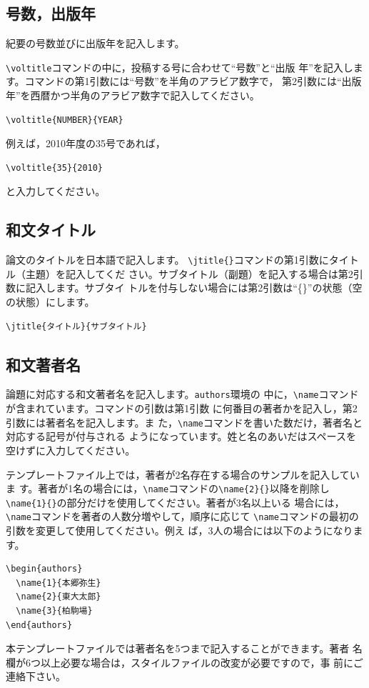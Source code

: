 \documentclass[b5paper,10pt,twocolumn,tombow]{jarticle}
\begin{document}
\subsection{号数，出版年}
紀要の号数並びに出版年を記入します。

\verb|\voltitle|コマンドの中に，投稿する号に合わせて``号数''と``出版
年''を記入します。コマンドの第1引数には``号数''を半角のアラビア数字で，
第2引数には``出版年''を西暦かつ半角のアラビア数字で記入してください。
\begin{verbatim}
\voltitle{NUMBER}{YEAR}
\end{verbatim}


例えば，2010年度の35号であれば，
\begin{verbatim}
\voltitle{35}{2010}
\end{verbatim}
と入力してください。

\subsection{和文タイトル}
論文のタイトルを日本語で記入します。
\verb|\jtitle{}|コマンドの第1引数にタイトル（主題）を記入してくだ
さい。サブタイトル（副題）を記入する場合は第2引数に記入します。サブタイ
トルを付与しない場合には第2引数は``\{\}''の状態（空の状態）にします。
\begin{verbatim}
\jtitle{タイトル}{サブタイトル}
\end{verbatim}

\subsection{和文著者名}
論題に対応する和文著者名を記入します。\texttt{authors}環境の
中に，\verb|\name|コマンドが含まれています。コマンドの引数は第1引数
に何番目の著者かを記入し，第2引数には著者名を記入します。ま
た，\verb|\name|コマンドを書いた数だけ，著者名と対応する記号が付与される
ようになっています。姓と名のあいだはスペースを空けずに入力してください。

テンプレートファイル上では，著者が2名存在する場合のサンプルを記入していま
す。著者が1名の場合には，\verb|\name|コマンドの\verb|\name{2}{}|以降を削除し
\verb|\name{1}{}|の部分だけを使用してください。著者が3名以上いる
場合には，\verb|\name|コマンドを著者の人数分増やして，順序に応じて
\verb|\name|コマンドの最初の引数を変更して使用してください。例え
ば，3人の場合には以下のようになります。
\begin{verbatim}
\begin{authors}
  \name{1}{本郷弥生}
  \name{2}{東大太郎}
  \name{3}{柏駒場}
\end{authors}
\end{verbatim}
本テンプレートファイルでは著者名を5つまで記入することができます。著者
名欄が6つ以上必要な場合は，スタイルファイルの改変が必要ですので，事
前にご連絡下さい。
\end{document}
